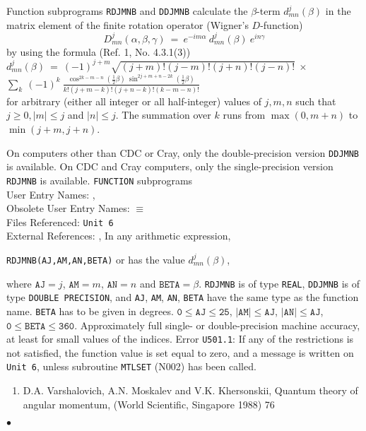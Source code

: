                
           
\Submitter{}                    
        
Function subprograms {\tt RDJMNB} and {\tt DDJMNB} calculate
the $\beta$-term $d _{mn}^j(\beta)$ in the matrix element of the finite
rotation operator (Wigner's $D$-function)
$$ D_{mn}^j(\alpha,\beta,\gamma) \ = \
\displaystyle e^{-im\alpha} \ d_{mn}^j(\beta) \ e^{in\gamma} $$
by using the formula (Ref. 1, No. 4.3.1(3)) \\ [4mm]
\hspace* {35mm}
$ \displaystyle d_{mn}^j(\beta) \ = \ \displaystyle
(-1)^{j+m} \sqrt{(j+m)!(j-m)!(j+n)!(j-n)!} \ \times $ \\ [4mm]
\hspace* {55mm}
$ \displaystyle \sum_k \ (-1)^k \
\frac{\cos^{2k-m-n}(\textstyle \frac{1}{2}\beta) \
\sin^{2j+m+n-2k}(\textstyle \frac{1}{2}\beta)}
{k!(j+m-k)!(j+n-k)!(k-m-n)!} $ \\ [4mm]
for arbitrary (either all integer or all half-integer) values of $j,m,n$
such that $j \ge 0, |m| \le j$ and $|n| \le j$. The summation over $k$
runs from $\max(0,m+n)$ to $\min(j+m,j+n)$.
\par
On computers other than CDC or Cray, only
the double-precision version {\tt DDJMNB} is available.
On CDC and  Cray computers, only the single-precision version
{\tt RDJMNB} is available.
\Structure
{\tt FUNCTION} subprograms \\
User Entry Names: , \\
Obsolete User Entry Names:  $\equiv$  \\
Files Referenced: {\tt Unit 6} \\
External References: \Rind{MTLMTR}{N002}, 
\Usage
In any arithmetic expression,
\begin{center}
{\tt RDJMNB(AJ,AM,AN,BETA)} \quad or 
\quad has the value \quad $d_{mn}^j(\beta)$,
\end{center}
where $\mathtt{AJ} = j$, $\mathtt{AM} = m$, $\mathtt{AN} = n$ and
$\mathtt{BETA} = \beta$.
{\tt RDJMNB} is of type {\tt REAL}, {\tt DDJMNB} is of type
{\tt DOUBLE PRECISION}, and {\tt AJ}, {\tt AM}, {\tt AN}, {\tt BETA}
have the same type as the function name. {\tt BETA} has to be given in
degrees.
\Restrict
$\mathtt{0 \le AJ \le 25}$, $\mathtt{|AM| \le AJ}$,
$\mathtt{|AN| \le AJ}$, $\mathtt{0 \le BETA \le 360}$.
\Accuracy
Approximately full single- or double-precision machine accuracy, at
least for small values of the indices.
\Errorh
Error {\tt U501.1}: If any of the restrictions is not satisfied,
the function value is set equal to zero, and a message is written on
{\tt Unit 6}, unless subroutine {\tt MTLSET} (N002) has been called.
\Refer
\begin{enumerate}
\item D.A. Varshalovich, A.N. Moskalev and V.K. Khersonskii,
Quantum theory of angular momentum, (World Scientific, Singapore 1988) 76
\end{enumerate}
$\bullet$
